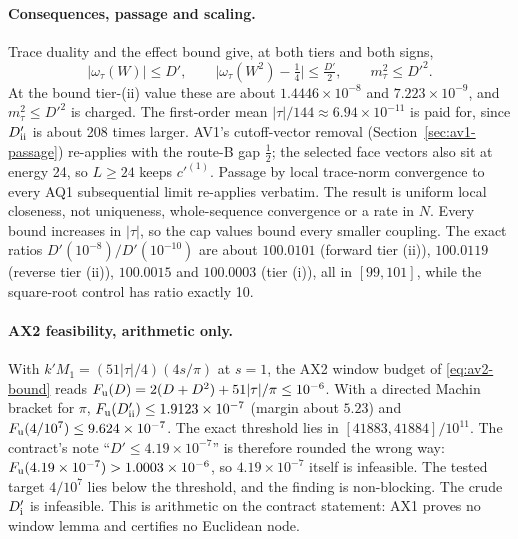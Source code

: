 \paragraph{Consequences, passage and scaling.}
Trace duality and the effect bound give, at both tiers and both signs,
\begin{equation}
 |\omega_\tau(W)|\le D',\qquad \bigl|\omega_\tau(W^2)-\tfrac14\bigr|\le\tfrac{D'}2,
 \qquad m_\tau^2\le D'^2 .
 \label{eq:ax1-consequences}
\end{equation}
At the bound tier-(ii) value these are about $1.4446\times10^{-8}$ and
$7.223\times10^{-9}$, and $m_\tau^2\le D'^2$ is charged. The first-order mean
$|\tau|/144\approx6.94\times10^{-11}$ is paid for, since $D'_{\rm ii}$ is
about 208 times larger. AV1's cutoff-vector removal
(Section~\ref{sec:av1-passage}) re-applies with the route-B gap $\tfrac12$;
the selected face vectors also sit at energy 24, so $L\ge24$ keeps
$c'^{(1)}$. Passage by local trace-norm convergence to every AQ1 subsequential
limit re-applies verbatim. The result is uniform local closeness, not
uniqueness, whole-sequence convergence or a rate in $N$. Every bound increases
in $|\tau|$, so the cap values bound every smaller coupling. The exact ratios
$D'(10^{-8})/D'(10^{-10})$ are about $100.0101$ (forward tier (ii)),
$100.0119$ (reverse tier (ii)), $100.0015$ and $100.0003$ (tier (i)), all in
$[99,101]$, while the square-root control has ratio exactly 10.

\paragraph{AX2 feasibility, arithmetic only.}
With $k'M_1=(51|\tau|/4)(4s/\pi)$ at $s=1$, the AX2 window budget of
\eqref{eq:av2-bound} reads $F_{\rm u}(D)=2(D+D^2)+51|\tau|/\pi\le10^{-6}$. With a
directed Machin bracket for $\pi$, $F_{\rm u}(D'_{\rm ii})\le1.9123\times10^{-7}$
(margin about $5.23$) and $F_{\rm u}(4/10^7)\le9.624\times10^{-7}$. The exact
threshold lies in $[41883,41884]/10^{11}$. The contract's note
``$D'\le4.19\times10^{-7}$'' is therefore rounded the wrong way:
$F_{\rm u}(4.19\times10^{-7})>1.0003\times10^{-6}$, so $4.19\times10^{-7}$ itself is
infeasible. The tested target $4/10^7$ lies below the threshold, and the
finding is non-blocking. The crude $D'_{\rm i}$ is infeasible. This is
arithmetic on the contract statement: AX1 proves no window lemma and certifies
no Euclidean node.


